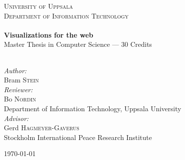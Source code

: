 \begin{titlepage}

\begin{center}

\textsc{\LARGE University of Uppsala}\\[1.5cm]
\textsc{\Large Department of Information Technology}\\[0.5cm]
\HRule \\[0.4cm]
{ \huge \bfseries Visualizations for the web}\\[0.1cm]
{\normalsize Master Thesis in Computer Science --- 30 Credits}
\\[0.2cm]
\HRule \\[1.5cm]

\end{center}



\large
\emph{Author:}\\
Bram \textsc{Stein}\\

\emph{Reviewer:} \\
Bo \textsc{Nordin}\\
\normalsize
Department of Information Technology, Uppsala University\\

\large
\emph{Advisor:} \\
Gerd \textsc{Hagmeyer-Gaverus}\\
\normalsize
Stockholm International Peace Research Institute\\
\vfill

\large

\begin{center} 
{\large \today}

\end{center}
\normalsize
\newpage
\thispagestyle{empty}
\mbox{}

\end{titlepage}
